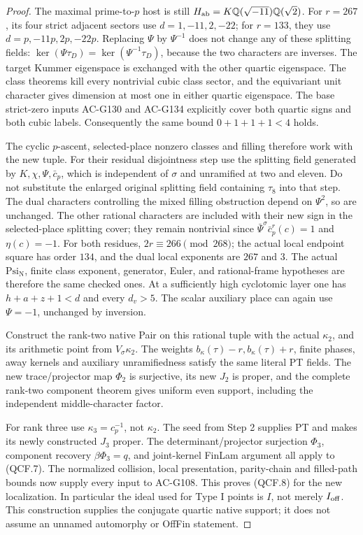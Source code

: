 \begin{proof}
The maximal prime-to-\(p\) host is still
\(H_{\rm ab}=K\mathbb Q(\sqrt{-11})\mathbb Q(\sqrt2)\).
For \(r=267\), its four strict adjacent sectors use
\(d=1,-11,2,-22\); for \(r=133\), they use
\(d=p,-11p,2p,-22p\).  Replacing \(\Psi\) by
\(\Psi^{-1}\) does not change any of these splitting fields:
\(\ker(\Psi\tau_D)=\ker(\Psi^{-1}\tau_D)\), because the
two characters are inverses.  The target Kummer eigenspace is
exchanged with the other quartic eigenspace.  The class theorems
kill every nontrivial cubic class sector, and the equivariant
unit character gives dimension at most one in either quartic
eigenspace.  The base strict-zero inputs AC-G130 and AC-G134
explicitly cover both quartic signs and both cubic labels.
Consequently the same bound \(0+1+1+1<4\) holds.

The cyclic \(p\)-ascent, selected-place nonzero classes and
filling therefore work with the new tuple.  For their residual
disjointness step use the splitting field generated by
\(K,\chi,\Psi,\bar c_p\), which is independent of \(\sigma\)
and unramified at two and eleven.  Do not substitute the enlarged
original splitting field containing \(\tau_8\) into that step.
The dual characters controlling the mixed filling obstruction
depend on \(\Psi^2\), so are unchanged.  The other rational
characters are included with their new sign in the selected-place
splitting cover; they remain nontrivial since
\(\bar\Psi^\sigma\bar c_p^r(c)=1\) and \(\eta(c)=-1\).
For both residues, \(2r\equiv266\pmod{268}\);
the actual local endpoint square has order \(134\), and the
dual local exponents are \(267\) and \(3\).  The actual
\(\mathrm{Psi_N}\), finite class exponent, generator, Euler,
and rational-frame hypotheses are therefore the same checked
ones.  At a sufficiently high cyclotomic layer one has
\(h+a+z+1<d\) and every \(d_v>5\).  The scalar auxiliary
place can again use \(\Psi=-1\), unchanged by inversion.

Construct the rank-two native Pair on this rational tuple with
the actual \(\kappa_2\), and its arithmetic point from
\(V_\sigma\kappa_2\).  The weights
\(b_\kappa(\tau)-r,b_\kappa(\tau)+r\), finite phases,
away kernels and auxiliary unramifiedness satisfy the same
literal PT fields.  The new trace/projector map \(\Phi_2\)
is surjective, its new \(J_2\) is proper, and the complete
rank-two component theorem gives uniform even support, including
the independent middle-character factor.

For rank three use \(\kappa_3=c_p^{-1}\), not \(\kappa_2\).
The seed from Step 2 supplies PT and makes its newly constructed
\(J_3\) proper.  The determinant/projector surjection
\(\Phi_3\), component recovery \(\beta\Phi_3=q\), and
joint-kernel FinLam argument all apply to (QCF.7).
The normalized collision, local presentation, parity-chain and
filled-path bounds now supply every input to AC-G108.  This proves
(QCF.8) for the new localization.  In particular the ideal used
for Type I points is \(I\), not merely \(I_{\rm off}\).
This construction supplies the conjugate quartic native support;
it does not assume an unnamed automorphy or OffFin statement.


\end{proof}
